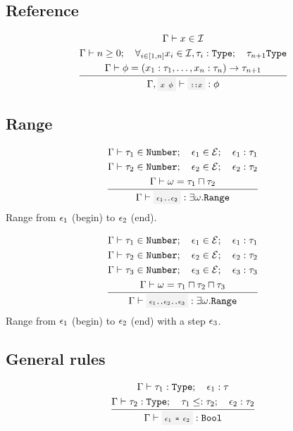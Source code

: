 
\subsection{Reference}


\[
	\infrule{
		\EnvSym\then x \in \Id \\*
		\EnvSym\then n \geq 0 \semiq \forall_{i\in[1,n]}{x_i\in\Id,\tau_i:\Type} \semiq \tau_{n+1}\Type \\*
		\EnvSym\then \phi = (x_1:\tau_1,\dotsc,x_n:\tau_n)\to\tau_{n+1} \\*
	}{
		\EnvSym,\code{$x$ $\phi$}\then \code{::$x$} : \phi
	}
\]

\clearpage

\subsection{Range}

\[
	\infrule{
		\EnvSym\then \tau_1 \in \Number \semiq \expr_1\in\Expr \semiq \expr_1:\tau_1\\*
		\EnvSym\then \tau_2 \in \Number \semiq \expr_2\in\Expr \semiq \expr_2:\tau_2 \\*
		\EnvSym\then \omega = \tau_1 \lwb \tau_2
	}{
		\EnvSym\then \code{$\expr_1$..$\expr_2$} : \exists\omega.\Range
	}
\]
Range from $\epsilon_1$ (begin) to $\epsilon_2$ (end).

\[
	\infrule{
		\EnvSym\then \tau_1 \in \Number \semiq \expr_1\in\Expr \semiq \expr_1:\tau_1\\*
		\EnvSym\then \tau_2 \in \Number \semiq \expr_2\in\Expr \semiq \expr_2:\tau_2 \\*
		\EnvSym\then \tau_3 \in \Number \semiq \expr_3\in\Expr \semiq \expr_3:\tau_3 \\*
		\EnvSym\then \omega = \tau_1 \lwb \tau_2 \lwb \tau_3
	}{
		\EnvSym\then \code{$\expr_1$..$\expr_2$..$\expr_3$} : \exists\omega.\Range
	}
\]
Range from $\epsilon_1$ (begin) to $\epsilon_2$ (end) with a step $\epsilon_3$.

\clearpage

\subsection{General rules}

\[
	\infrule{
		\EnvSym\then \tau_1:\Type \semiq \expr_1:\tau \\*
		\EnvSym\then \tau_2:\Type \semiq \tau_1 \narreq \tau_2 \semiq \expr_2:\tau_2
	}{
		\EnvSym\then \code{$\expr_1$ = $\expr_2$} : \Bool
	}
\]

